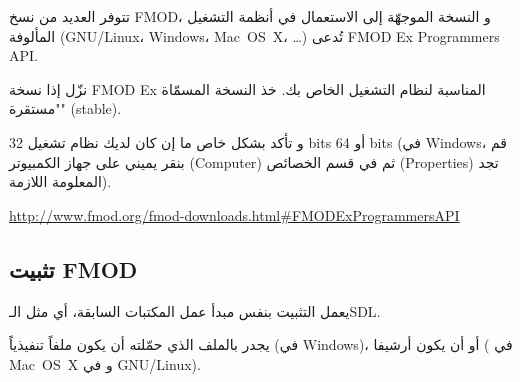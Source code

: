 تتوفر العديد من نسخ
\textenglish{FMOD}،
و النسخة الموجهّة إلى الاستعمال في أنظمة التشغيل المألوفة
(\mbox{\textenglish{GNU/Linux}}، \textenglish{Windows}، \mbox{\textenglish{Mac OS X}}، \dots)
تُدعى
\textenglish{FMOD Ex Programmers API}.

نزّل إذا نسخة
\textenglish{FMOD Ex}
المناسبة لنظام التشغيل الخاص بك. خذ النسخة المسمّاة "مستقرة"
(\textenglish{stable}).

و تأكد بشكل خاص ما إن كان لديك نظام تشغيل
\textenglish{32 bits}
أو
\textenglish{64 bits}
(في
\textenglish{Windows}،
 قم بنقر يميني على جهاز الكمبيوتر
(\textenglish{Computer})
ثم في قسم الخصائص
(\textenglish{Properties})
تجد المعلومة اللازمة).

\url{http://www.fmod.org/fmod-downloads.html#FMODExProgrammersAPI}

\subsection{تثبيت \textenglish{FMOD}}

يعمل التثبيت بنفس مبدأ عمل المكتبات السابقة، أي مثل الـ\textenglish{SDL}.

يجدر بالملف الذي حمّلته أن يكون ملفاً تنفيذياً (في
\textenglish{Windows})،
 أو أن يكون أرشيفا 
(
في
\mbox{\textenglish{Mac OS X}}
و
في
\mbox{\textenglish{GNU/Linux}}).

